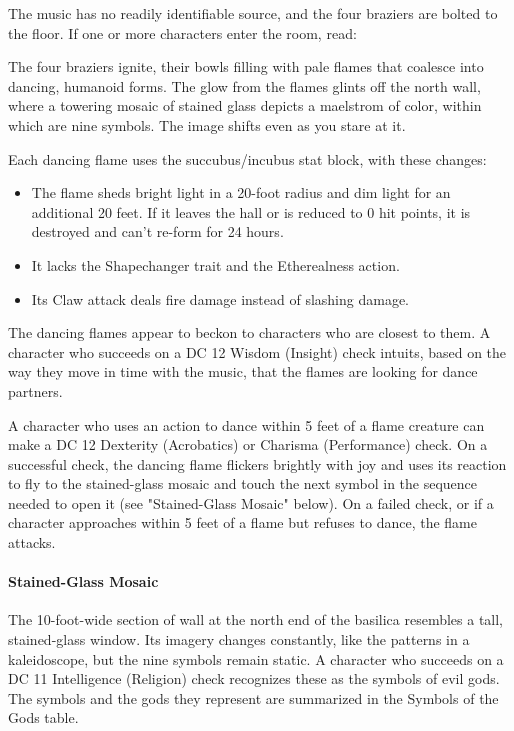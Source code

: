 \documentclass[10pt,a4paper,twoside,bg=print,twocolumn,openany,nodeprecatedcode]{dndbook}
\begin{document}
The music has no readily identifiable source, and the four braziers are bolted to the floor. If one or more characters enter the room, read:

\begin{DndReadAloud}{}
The four braziers ignite, their bowls filling with pale flames that coalesce into dancing, humanoid forms. The glow from the flames glints off the north wall, where a towering mosaic of stained glass depicts a maelstrom of color, within which are nine symbols. The image shifts even as you stare at it.

\end{DndReadAloud}

Each dancing flame uses the succubus/incubus stat block, with these changes:

\begin{itemize}
\item The flame sheds bright light in a 20-foot radius and dim light for an additional 20 feet. If it leaves the hall or is reduced to 0 hit points, it is destroyed and can't re-form for 24 hours.
\item It lacks the Shapechanger trait and the Etherealness action.
\item Its Claw attack deals fire damage instead of slashing damage.
\end{itemize}

The dancing flames appear to beckon to characters who are closest to them. A character who succeeds on a DC 12 Wisdom (Insight) check intuits, based on the way they move in time with the music, that the flames are looking for dance partners.

A character who uses an action to dance within 5 feet of a flame creature can make a DC 12 Dexterity (Acrobatics) or Charisma (Performance) check. On a successful check, the dancing flame flickers brightly with joy and uses its reaction to fly to the stained-glass mosaic and touch the next symbol in the sequence needed to open it (see "Stained-Glass Mosaic" below). On a failed check, or if a character approaches within 5 feet of a flame but refuses to dance, the flame attacks.

\paragraph{Stained-Glass Mosaic}
The 10-foot-wide section of wall at the north end of the basilica resembles a tall, stained-glass window. Its imagery changes constantly, like the patterns in a kaleidoscope, but the nine symbols remain static. A character who succeeds on a DC 11 Intelligence (Religion) check recognizes these as the symbols of evil gods. The symbols and the gods they represent are summarized in the Symbols of the Gods table.
\end{document}
